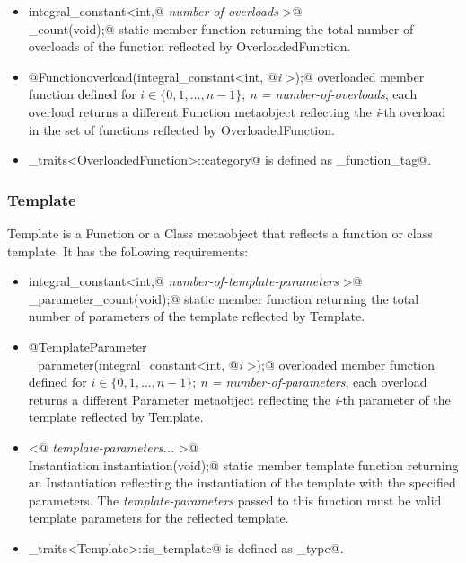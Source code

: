 \begin{itemize}

	\item{\verb@static integral_constant<int,@ {\em number-of-overloads}
	\verb@>@\\\verb@overload_count(void);@} static member function returning the total number
	of overloads of the function reflected by {\metaobject OverloadedFunction}.

	\item{\verb@static @{\metaobject Function}\verb@ overload(integral_constant<int, @{\em i}
	\verb@>);@} overloaded member function defined
	for $i \in \{0, 1, \dots, n-1\}$; {\em n = number-of-overloads},
	each overload returns a different {\metaobject Function} metaobject reflecting the {\em i}-th overload
	in the set of functions reflected by {\metaobject OverloadedFunction}.

	\item \verb@metaobject_traits<OverloadedFunction>::category@ is defined as 
	\verb@overloaded_function_tag@.
\end{itemize}

\subsubsection{Template}

{\metaobject Template} is a {\metaobject Function} or a {\metaobject Class} metaobject
that reflects a function or class template. It has the following requirements:

\begin{itemize}

	\item{\verb@static integral_constant<int,@ {\em number-of-template-parameters}
	\verb@>@\\\verb@template_parameter_count(void);@} static member function returning the total number
	of parameters of the template reflected by {\metaobject Template}.

	\item{\verb@static @{\metaobject TemplateParameter}\\\verb@template_parameter(integral_constant<int, @{\em i}
	\verb@>);@} overloaded member function defined
	for $i \in \{0, 1, \dots, n-1\}$; {\em n = number-of-parameters},
	each overload returns a different {\metaobject Parameter} metaobject reflecting the {\em i}-th parameter
	of the template reflected by {\metaobject Template}.

	\item{\verb@template <@ {\em template-parameters...} \verb@>@\\
	\verb@static Instantiation instantiation(void);@} static member template function returning an {\metaobject Instantiation}
	reflecting the instantiation of the template with the specified parameters. The {\em template-parameters} passed
	to this function must be valid template parameters for the reflected template.

	\item \verb@metaobject_traits<Template>::is_template@ is defined as \verb@true_type@.
\end{itemize}

